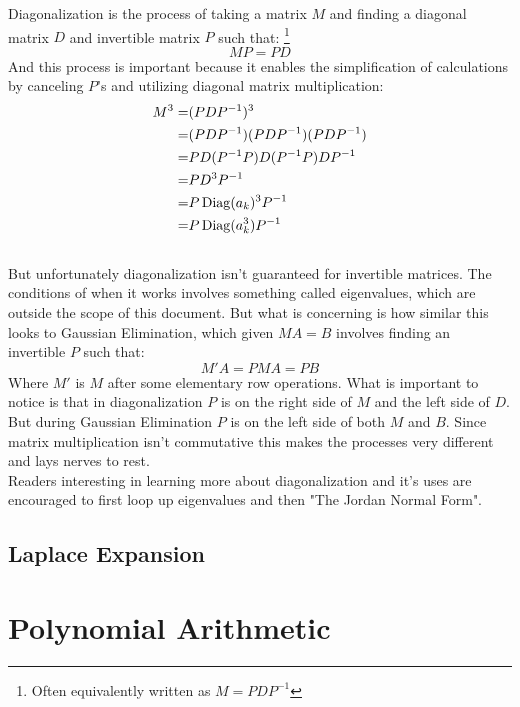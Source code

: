 Diagonalization is the process of taking a matrix $M$ and finding a diagonal matrix $D$ and invertible matrix $P$ such that:
\footnote{Often equivalently written as $M = PDP^{-1}$}
\[MP = PD\]
And this process is important because it enables the simplification of calculations by canceling $P$'s and utilizing diagonal matrix multiplication:
\begin{equation*}
\begin{aligned}
 M^3 =& (PDP^{-1})^3 \\
 =& (PDP^{-1})(PDP^{-1})(PDP^{-1}) \\
 =& PD(P^{-1} P)D(P^{-1} P)DP^{-1} \\
 =& PD^3P^{-1} \\
 =& P\operatorname{Diag}(a_k)^3P^{-1} \\
 =& P\operatorname{Diag}(a_k^3)P^{-1} \\
\end{aligned}
\end{equation*}
\\

But unfortunately diagonalization isn't guaranteed for invertible matrices.
The conditions of when it works involves something called eigenvalues,
which are outside the scope of this document.
But what is concerning is how similar this looks to Gaussian Elimination,
which given $MA =B$ involves finding an invertible $P$ such that:
\[M'A =PMA = PB\]
Where $M'$ is $M$ after some elementary row operations.
What is important to notice is that in diagonalization $P$ is on the right side of $M$ and the left side of $D$.
But during Gaussian Elimination $P$ is on the left side of both $M$ and $B$.
Since matrix multiplication isn't commutative this makes the processes very different and lays nerves to rest. 
\\

Readers interesting in learning more about diagonalization and it's uses are encouraged to first loop up eigenvalues and then "The Jordan Normal Form".

\subsection{Laplace Expansion}
\label{appx:laplace-expansion}

\section{Polynomial Arithmetic}
